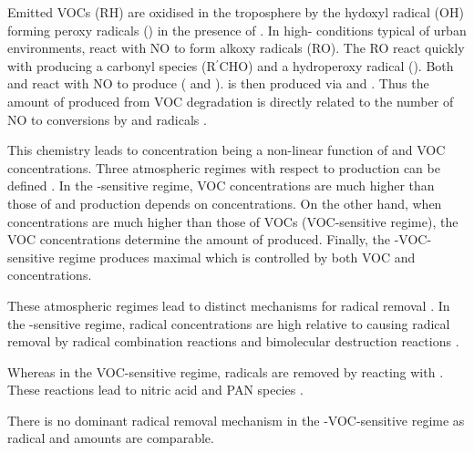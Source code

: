 Emitted VOCs (RH) are oxidised in the troposphere by the hydoxyl radical (OH) forming peroxy radicals () in the presence of  . 
In high- conditions typical of urban environments,  react with NO  to form alkoxy radicals (RO).
The RO react quickly with   producing a carbonyl species (R$^{\prime}$CHO) and a hydroperoxy radical ().
Both  and  react with NO to produce  ( and ).
 is then produced via  and . 
Thus the amount of  produced from VOC degradation is directly related to the number of NO to  conversions by  and  radicals \citep{Atkinson:2000}.
\begin{reactionlist}
\end{reactionlist}

This chemistry leads to  concentration being a non-linear function of  and VOC concentrations.
Three atmospheric regimes with respect to  production can be defined \citep{Jenkin:2000}. 
In the -sensitive regime, VOC concentrations are much higher than those of  and  production depends on  concentrations. 
On the other hand, when  concentrations are much higher than those of VOCs (VOC-sensitive regime), the VOC concentrations determine the amount of  produced.
Finally, the -VOC-sensitive regime produces maximal  which is controlled by both VOC and  concentrations.

These atmospheric regimes lead to distinct mechanisms for radical removal \citep{Kleinman:1991}. 
In the -sensitive regime, radical concentrations are high relative to  causing radical removal by radical combination reactions  and bimolecular destruction reactions  \citep{Kleinman:1994}.
\begin{reactionlist}
\end{reactionlist}
Whereas in the VOC-sensitive regime, radicals are removed by reacting with .
These reactions lead to nitric acid  and PAN species .
\begin{reactionlist}
\end{reactionlist}
There is no dominant radical removal mechanism in the -VOC-sensitive regime as radical and  amounts are comparable.

